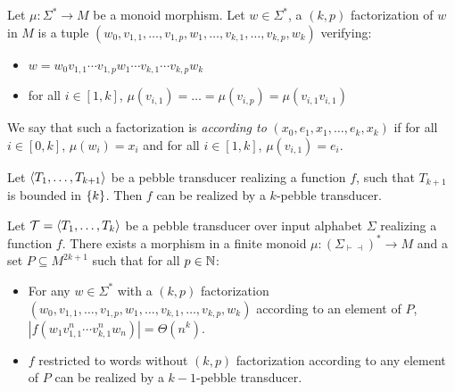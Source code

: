 
\begin{definition}
    Let $\mu:\Sigma^*\rightarrow M$ be a monoid morphism. Let $w\in \Sigma^*$, a $(k,p)$ factorization of $w$ in $M$ is a tuple $(w_0,v_{1,1},\ldots,v_{1,p},w_1,\ldots,v_{k,1},\ldots,v_{k,p}, w_k)$ verifying:
    \begin{itemize}   
        \item  $w=w_0v_{1,1}\cdots v_{1,p}w_1\cdots v_{k,1}\cdots v_{k,p} w_k$
        \item for all $i\in [1,k]$, $\mu(v_{i,1})=\ldots=\mu(v_{i,p})=\mu(v_{i,1}v_{i,1})$
    \end{itemize}
    We say that such a factorization is \emph{according to} $(x_0,e_1,x_1,\ldots,e_k,x_k)$ if for all $i\in [0,k]$, $\mu(w_i)=x_i$ and for all $i\in [1,k]$, $\mu(v_{i,1})=e_i$.
\end {definition}


\begin{comment}
\begin{lemma}
Let $\Tt=\tuple{T_k,\ldots,T_1}$ be a $k$-pebble transducer over input alphabet $\Sigma$.
One can obtain a new $k$-pebble transducer $\Tt'=\tuple{T_k',\ldots,T_1'}$ over $\Sigma'=\Sigma\times L $ such that:
\begin{itemize}
\item for any $w\in \Sigma'^*$, $\Tt'(w)=\Tt\circ\pi_{\Sigma}(w)$
\item For any $\bigcup_{j<k} Q_j'$-producing triple $(w_1,w_2,w_3)$, we have $\Tt'(w_1w_2^kw_3)=\Theta(|w_2|^k)$
\end{itemize}

\end{lemma}
\end{comment}

\begin{lemma}  
    Let $\langle T_1,\ldots,T_{k+1} \rangle$ be a pebble transducer realizing a function $f$, such that $T_{k+1}$ is bounded in $\{k\}$. Then $f$ can be realized by a $k$-pebble transducer.
\end{lemma}     

\begin{lemma}
    Let ${\mathcal T}=\langle T_1,\ldots,T_k \rangle$ be a pebble transducer over input alphabet $\Sigma$ realizing a function $f$.
    There exists a morphism in a finite monoid $\mu:(\Sigma_{\vdash\dashv})^*\rightarrow M$ and a set $P\subseteq M^{2k+1}$ such that for all $p\in \mathbb{N}$:
    \begin{itemize}
    \item For any $w\in \Sigma^*$ with a $(k,p)$ factorization 
       $(w_0,v_{1,1},\ldots,v_{1,p},w_1,\ldots,v_{k,1},\ldots,v_{k,p}, w_k)$ according to an element of $P$, $|f(w_1v_{1,1}^n\cdots v_{k,1}^nw_n)|=\Theta(n^k)$.
    \item $f$ restricted to words without $(k,p)$ factorization according to any element of $P$ can be realized by a $k{-}1$-pebble transducer.
    \end{itemize}
    
\end{lemma}



